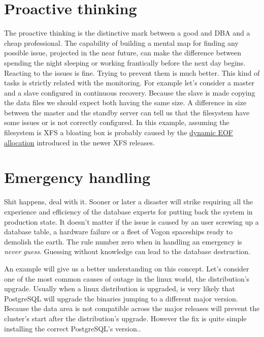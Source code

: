 \section{Proactive thinking}
The proactive thinking is the distinctive mark between a good and DBA and a cheap professional. The 
capability of building a mental map for finding any possible issue, projected in the near future, can 
make the difference between spending the night sleeping or working frantically before the next day begins. 
Reacting to the issues is fine. Trying to prevent them is much better. This kind of tasks is strictly 
related with the monitoring. For example let's consider a master and a slave configured in continuous 
recovery. Because the slave is made copying the data files we should expect both having the same size. 
A difference in size between the master and the standby server can tell us that the filesystem have some 
issues or is not correctly configured. In this example, assuming the filesystem is XFS a bloating box is 
probably caused by the \href{
http://serverfault.com/questions/406069/why-are-my-xfs-filesystems-suddenly-consuming-more-space-and-full-of
-sparse-file}{dynamic EOF allocation} introduced in the newer XFS releases.

\section{Emergency handling}
Shit happens, deal with it. Sooner or later a disaster will strike requiring all the experience and 
efficiency of the database experts for putting back the system in production state. It doesn't matter if 
the issue is caused by an user screwing up a database table, a hardware failure or a fleet of Vogon 
spaceships ready to demolish the earth. The rule number zero when in handling an emergency is \textit{never 
guess}. Guessing without knowledge can lead to the database destruction.\newline

An example will give us a better understanding on this concept. Let's consider one of the most common 
causes of outage in the linux world, the distribution's upgrade. Usually when a linux distribution is 
upgraded, is very likely that PostgreSQL will upgrade the binaries jumping to a different major version. 
Because the data area is not compatible across the major releases will prevent the cluster's start 
after the distribution's upgrade. However the fix is quite simple installing the correct PostgreSQL's 
version.\newline.


